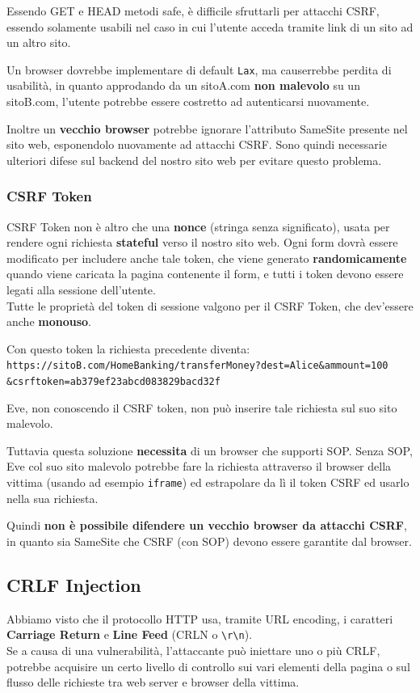 \documentclass{article}
\begin{document}
Essendo GET e HEAD metodi safe, è difficile sfruttarli per attacchi CSRF, essendo solamente usabili nel caso in cui l'utente acceda tramite link di un sito ad un altro sito.

Un browser dovrebbe implementare di default \verb|Lax|, ma causerrebbe perdita di usabilità, in quanto approdando da un sitoA.com \textbf{non malevolo} su un sitoB.com, l'utente potrebbe essere costretto ad autenticarsi nuovamente.

Inoltre un \textbf{vecchio browser} potrebbe ignorare l'attributo SameSite presente nel sito web, esponendolo nuovamente ad attacchi CSRF. Sono quindi necessarie ulteriori difese sul backend del nostro sito web per evitare questo problema.

\subsubsection{CSRF Token}
CSRF Token non è altro che una \textbf{nonce} (stringa senza significato), usata per rendere ogni richiesta \textbf{stateful} verso il nostro sito web. Ogni form dovrà essere modificato per includere
anche tale token, che viene generato \textbf{randomicamente} quando viene caricata la pagina contenente il form, e tutti i token devono essere legati alla sessione dell’utente.\\ Tutte le proprietà del token di sessione valgono per il CSRF Token, che dev'essere anche \textbf{monouso}.

Con questo token la richiesta precedente diventa:\\
\verb|https://sitoB.com/HomeBanking/transferMoney?dest=Alice&ammount=100|\\ \verb|&csrftoken=ab379ef23abcd083829bacd32f|

Eve, non conoscendo il CSRF token, non può inserire tale richiesta sul suo sito malevolo.

Tuttavia questa soluzione \textbf{necessita} di un browser che supporti SOP. Senza SOP, Eve col suo sito malevolo potrebbe fare la richiesta attraverso il browser della vittima (usando ad esempio \verb|iframe|) ed estrapolare da lì il token CSRF ed usarlo nella sua richiesta.

Quindi \textbf{non è possibile difendere un vecchio browser da attacchi CSRF}, in quanto sia SameSite che CSRF (con SOP) devono essere garantite dal browser.

\subsection{CRLF Injection}
Abbiamo visto che il protocollo HTTP usa, tramite URL encoding, i caratteri \textbf{Carriage Return} e \textbf{Line Feed} (CRLN o \verb|\r\n|).\\
Se a causa di una vulnerabilità, l'attaccante può iniettare uno o più CRLF, potrebbe acquisire un certo livello di controllo sui vari elementi della pagina o sul flusso delle richieste tra web server e browser della vittima.
\end{document}
